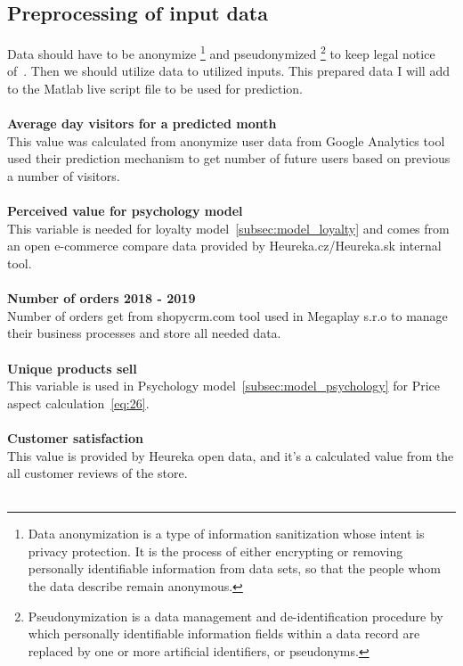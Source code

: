\subsection{Preprocessing of input data} \label{subsec:preprocessing}
Data should have to be anonymize \footnote{Data anonymization is a type of information sanitization whose intent is privacy protection.
It is the process of either encrypting or removing personally identifiable information from data sets, so that
the people whom the data describe remain anonymous.} and pseudonymized \footnote{Pseudonymization is a data management
and de-identification procedure by which personally identifiable information fields within a data record are replaced
by one or more artificial identifiers, or pseudonyms.} to keep legal notice of~\cite{gdpr}.
Then we should utilize data to utilized inputs.
This prepared data I will add to the Matlab live script file to be used for prediction.\\
\\
\textbf{Average day visitors for a predicted month}\\
This value was calculated from anonymize user data from Google Analytics tool used their prediction mechanism to get number of future users based on previous a number of visitors.\\
\\
\textbf{Perceived value for psychology model} \label{perceived}\\
This variable is needed for loyalty model~\ref{subsec:model_loyalty} and comes from an open e-commerce compare data provided by Heureka.cz/Heureka.sk internal tool.\\
\\
\textbf{Number of orders 2018 - 2019}\\
Number of orders get from shopycrm.com tool used in Megaplay s.r.o to manage their business processes and store all needed data.\\
\\
\textbf{Unique products sell}\\
This variable is used in Psychology model~\ref{subsec:model_psychology} for Price aspect calculation~\ref{eq:26}.\\
\\
\textbf{Customer satisfaction} \label{customerSat}\\
This value is provided by Heureka open data, and it's a calculated value from the all customer reviews of the store.\\
\\
